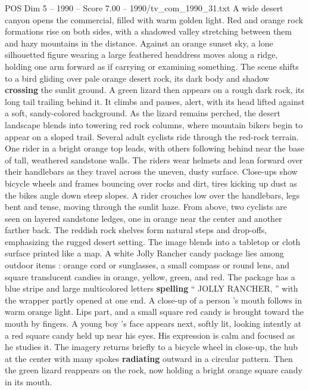\begin{textsample}{POS Dim 5 – 1990 – Score 7.00 – 1990/tv\_com\_1990\_31.txt}  \label{ex:f5_pos_020}
A wide desert canyon opens the commercial, filled with warm golden light.
Red and orange rock formations rise on both sides, with a shadowed valley stretching between them and hazy mountains in the distance.
Against an orange sunset sky, a lone silhouetted figure wearing a large feathered headdress moves along a ridge, holding one arm forward as if carrying or examining something.
The scene shifts to a bird gliding over pale orange desert rock, its dark body and shadow \textbf{crossing} the sunlit ground.
A green lizard then appears on a rough dark rock, its long tail trailing behind it.
It climbs and pauses, alert, with its head lifted against a soft, sandy-colored background.
As the lizard remains perched, the desert landscape blends into towering red rock columns, where mountain bikers begin to appear on a sloped trail.
Several adult cyclists ride through the red-rock terrain.
One rider in a bright orange top leads, with others following behind near the base of tall, weathered sandstone walls.
The riders wear helmets and lean forward over their handlebars as they travel across the uneven, dusty surface.
Close-ups show bicycle wheels and frames bouncing over rocks and dirt, tires kicking up dust as the bikes angle down steep slopes.
A rider crouches low over the handlebars, legs bent and tense, moving through the sunlit haze.
From above, two cyclists are seen on layered sandstone ledges, one in orange near the center and another farther back.
The reddish rock shelves form natural steps and drop-offs, emphasizing the rugged desert setting.
The image blends into a tabletop or cloth surface printed like a map.
A white Jolly Rancher candy package lies among outdoor items : orange cord or sunglasses, a small compass or round lens, and square translucent candies in orange, yellow, green, and red.
The package has a blue stripe and large multicolored letters \textbf{spelling} “ JOLLY RANCHER, ” with the wrapper partly opened at one end.
A close-up of a person ’s mouth follows in warm orange light.
Lips part, and a small square red candy is brought toward the mouth by fingers.
A young boy ’s face appears next, softly lit, looking intently at a red square candy held up near his eyes.
His expression is calm and focused as he studies it.
The imagery returns briefly to a bicycle wheel in close-up, the hub at the center with many spokes \textbf{radiating} outward in a circular pattern.
Then the green lizard reappears on the rock, now holding a bright orange square candy in its mouth.

\end{textsample}
